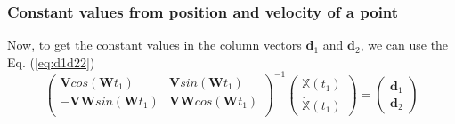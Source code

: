\documentclass[review]{elsarticle}
\begin{document}
\subsubsection{Constant values from position and velocity of a point}
Now, to get the constant values in the column vectors $\mathbf{d}_1$ and $\mathbf{d}_2$, we can
use the Eq. (\ref{eq:d1d22})
\begin{equation}\label{eq:d1d22}
  \left( 
 \begin{matrix}
\mathbf{V}cos(\mathbf{W}t_1) & \mathbf{V}sin(\mathbf{W}t_1)\\
-\mathbf{V}\mathbf{W}sin(\mathbf{W}t_1) & \mathbf{V}\mathbf{W}cos(\mathbf{W}t_1)\\
 \end{matrix}
 \right)^{-1}
 \left( 
 \begin{matrix}
\mathbb{X}(t_1) \\
\dot{\mathbb{X}}(t_1)
 \end{matrix}
 \right)=
  \left( 
 \begin{matrix}
\mathbf{d}_1 \\
\mathbf{d}_2
 \end{matrix}
 \right)
\end{equation}

\end{document}
